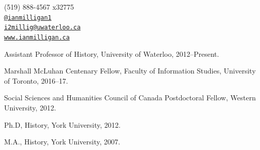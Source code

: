 \documentclass[11pt,article,oneside]{memoir}
\makeatletter
\def\myemail{i2millig@uwaterloo.ca}
\def\myweb{www.ianmilligan.ca}
\def\myphone{(519) 888-4567 x32775}
\def\mytwitter{@ianmilligan1}
\makeatother
\begin{document}
\begin{minipage}[t]{2.95in}
  
\end{minipage}
\hfill     
\hfill
\begin{minipage}[t]{1.3in}
  \flushright \footnotesize  \addressblock \myphone \, \faPhone \\ 
  {\texttt{\href{http://twitter.com/ianmilligan1}{\mytwitter}} \, \faTwitter }  \\ 
  {\texttt{\href{mailto:\myemail}{\myemail}} \, \faEnvelope} \\
  {\texttt{\href{\myweb}{\myweb}} \, \faGlobe}
\end{minipage}

\medskip

\reversemarginpar

\bigskip       


{}

\ind Assistant Professor of History, University of Waterloo, 2012--Present.      

\ind Marshall McLuhan Centenary Fellow, Faculty of Information Studies, University of Toronto, 2016--17.

\ind Social Sciences and Humanities Council of Canada Postdoctoral Fellow, Western University, 2012.

\bigskip




\ind Ph.D, History, York University, 2012.

\ind M.A., History, York University, 2007. 
\end{document}
